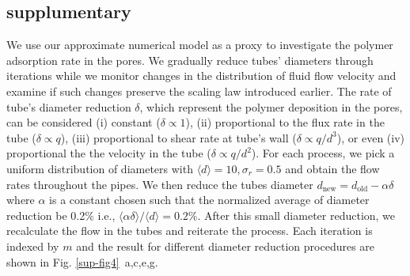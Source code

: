 \subsection{supplumentary}
We use our approximate numerical model as a proxy to investigate the polymer adsorption rate in the pores. We gradually reduce  tubes' diameters through iterations while we monitor changes in the distribution of fluid flow velocity and examine if such changes preserve the scaling law introduced earlier. The rate of tube's diameter reduction $\delta$, which represent the polymer deposition in the pores, can be considered (i) constant ($\delta \propto 1$), (ii) proportional to the flux rate in the tube ($\delta \propto q$), (iii) proportional to shear rate at tube's wall ($\delta \propto q/d^3$), or even (iv) proportional the the velocity in the tube ($\delta \propto q/d^2$). For each process, we pick a uniform distribution of diameters with $\langle d\rangle =10,\sigma_r=0.5$ and obtain the flow rates throughout the pipes. We then reduce the tubes diameter  $d_\text{new} = d_\text{old} - \alpha \delta $ where  $\alpha$ is a constant chosen such that the normalized average of diameter reduction be 0.2\% i.e., $\langle \alpha \delta\rangle /\langle d\rangle = 0.2\%$. After this small diameter reduction, we recalculate the flow in the tubes and reiterate the process.  Each iteration is indexed by $m$ and the result for different diameter reduction procedures are shown in Fig. \ref{sup-fig4}~a,c,e,g.
